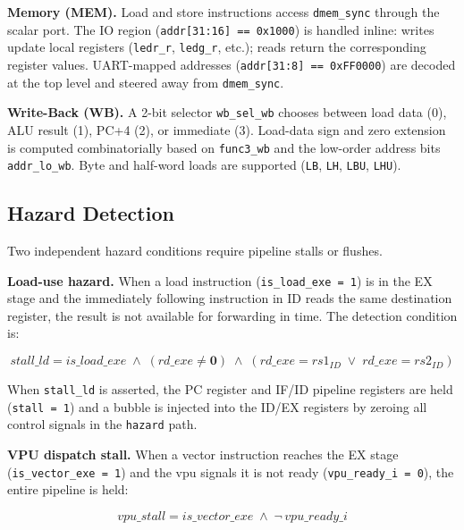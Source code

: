 \textbf{Memory (MEM).} Load and store instructions access \texttt{dmem\_sync} through
the scalar port. The IO region (\texttt{addr[31:16] == 0x1000}) is handled inline:
writes update local registers (\texttt{ledr\_r}, \texttt{ledg\_r}, etc.); reads return
the corresponding register values. UART-mapped addresses (\texttt{addr[31:8] == 0xFF0000})
are decoded at the top level and steered away from \texttt{dmem\_sync}.

\textbf{Write-Back (WB).} A 2-bit selector \texttt{wb\_sel\_wb} chooses between load
data (0), ALU result (1), PC+4 (2), or immediate (3). Load-data sign and zero extension
is computed combinatorially based on \texttt{func3\_wb} and the low-order address bits
\texttt{addr\_lo\_wb}. Byte and half-word loads are supported (\texttt{LB}, \texttt{LH},
\texttt{LBU}, \texttt{LHU}).

\subsection{Hazard Detection}
\label{subsec:hazard}

Two independent hazard conditions require pipeline stalls or flushes.

\textbf{Load-use hazard.} When a load instruction (\texttt{is\_load\_exe = 1}) is in
the EX stage and the immediately following instruction in ID reads the same destination
register, the result is not available for forwarding in time. The detection condition is:

\begin{equation}
\mathit{stall\_ld} = \mathit{is\_load\_exe} \;\wedge\; (\mathit{rd\_exe} \neq \mathbf{0})
  \;\wedge\; (\mathit{rd\_exe} = \mathit{rs1_{ID}} \;\vee\; \mathit{rd\_exe} = \mathit{rs2_{ID}})
\label{eq:load_use}
\end{equation}

When \texttt{stall\_ld} is asserted, the PC register and IF/ID pipeline registers are
held (\texttt{stall = 1}) and a bubble is injected into the ID/EX registers by
zeroing all control signals in the \texttt{hazard} path.

\textbf{VPU dispatch stall.} When a vector instruction reaches the EX stage
(\texttt{is\_vector\_exe = 1}) and the \gls{vpu} signals it is not ready
(\texttt{vpu\_ready\_i = 0}), the entire pipeline is held:

\begin{equation}
\mathit{vpu\_stall} = \mathit{is\_vector\_exe} \;\wedge\; \neg\,\mathit{vpu\_ready\_i}
\label{eq:vpu_stall}
\end{equation}

